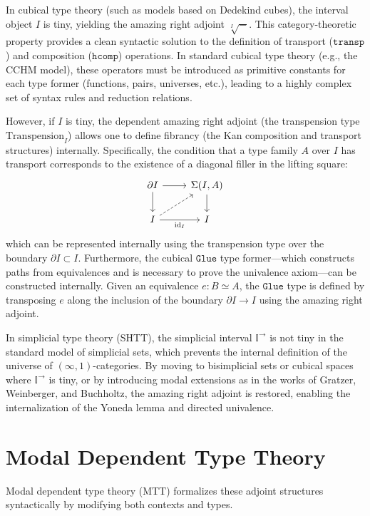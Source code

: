 \documentclass{article}
\begin{document}
\begin{example}
In cubical type theory (such as models based on Dedekind cubes), the interval object $I$ is tiny, yielding the amazing right adjoint $\sqrt[I]{-}$. This category-theoretic property provides a clean syntactic solution to the definition of transport ($\mathtt{transp}$) and composition ($\mathtt{hcomp}$) operations. In standard cubical type theory (e.g., the CCHM model), these operators must be introduced as primitive constants for each type former (functions, pairs, universes, etc.), leading to a highly complex set of syntax rules and reduction relations. 

However, if $I$ is tiny, the dependent amazing right adjoint (the transpension type $\mathrm{Transpension}_I$) allows one to define fibrancy (the Kan composition and transport structures) internally. Specifically, the condition that a type family $A$ over $I$ has transport corresponds to the existence of a diagonal filler in the lifting square:
\[
\begin{tikzcd}
\partial I \arrow[r] \arrow[d] & \Sigma(I, A) \arrow[d] \\
I \arrow[r, "\mathrm{id}_I"'] \arrow[ur, dashed] & I
\end{tikzcd}
\]
which can be represented internally using the transpension type over the boundary $\partial I \subset I$. Furthermore, the cubical $\mathtt{Glue}$ type former—which constructs paths from equivalences and is necessary to prove the univalence axiom—can be constructed internally. Given an equivalence $e: B \simeq A$, the $\mathtt{Glue}$ type is defined by transposing $e$ along the inclusion of the boundary $\partial I \to I$ using the amazing right adjoint.

In simplicial type theory (SHTT), the simplicial interval $\mathbb{I}^{\to}$ is not tiny in the standard model of simplicial sets, which prevents the internal definition of the universe of $(\infty, 1)$-categories. By moving to bisimplicial sets or cubical spaces where $\mathbb{I}^{\to}$ is tiny, or by introducing modal extensions as in the works of Gratzer, Weinberger, and Buchholtz, the amazing right adjoint is restored, enabling the internalization of the Yoneda lemma and directed univalence.
\end{example}

\section{Modal Dependent Type Theory}
Modal dependent type theory (MTT) formalizes these adjoint structures syntactically by modifying both contexts and types.
\end{document}
